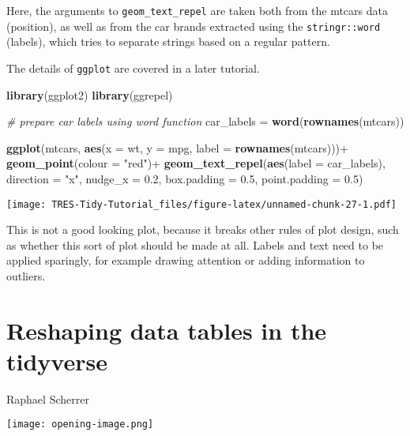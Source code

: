 \documentclass[
]{book}
\newenvironment{Shaded}{}{}
\newcommand{\CommentTok}[1]{\textcolor[rgb]{0.38,0.63,0.69}{\textit{#1}}}
\newcommand{\DataTypeTok}[1]{\textcolor[rgb]{0.56,0.13,0.00}{#1}}
\newcommand{\FloatTok}[1]{\textcolor[rgb]{0.25,0.63,0.44}{#1}}
\newcommand{\KeywordTok}[1]{\textcolor[rgb]{0.00,0.44,0.13}{\textbf{#1}}}
\newcommand{\NormalTok}[1]{#1}
\newcommand{\OperatorTok}[1]{\textcolor[rgb]{0.40,0.40,0.40}{#1}}
\newcommand{\StringTok}[1]{\textcolor[rgb]{0.25,0.44,0.63}{#1}}
\begin{document}
Here, the arguments to \texttt{geom\_text\_repel} are taken both from the mtcars data (position), as well as from the car brands extracted using the \texttt{stringr::word} (labels), which tries to separate strings based on a regular pattern.

The details of \texttt{ggplot} are covered in a later tutorial.

\begin{Shaded}
\begin{Highlighting}[]
\KeywordTok{library}\NormalTok{(ggplot2)}
\KeywordTok{library}\NormalTok{(ggrepel)}

\CommentTok{# prepare car labels using word function}
\NormalTok{car_labels =}\StringTok{ }\KeywordTok{word}\NormalTok{(}\KeywordTok{rownames}\NormalTok{(mtcars))}

\KeywordTok{ggplot}\NormalTok{(mtcars,}
       \KeywordTok{aes}\NormalTok{(}\DataTypeTok{x =}\NormalTok{ wt, }\DataTypeTok{y =}\NormalTok{ mpg,}
           \DataTypeTok{label =} \KeywordTok{rownames}\NormalTok{(mtcars)))}\OperatorTok{+}
\StringTok{  }\KeywordTok{geom_point}\NormalTok{(}\DataTypeTok{colour =} \StringTok{"red"}\NormalTok{)}\OperatorTok{+}
\StringTok{  }\KeywordTok{geom_text_repel}\NormalTok{(}\KeywordTok{aes}\NormalTok{(}\DataTypeTok{label =}\NormalTok{ car_labels),}
                  \DataTypeTok{direction =} \StringTok{"x"}\NormalTok{,}
                  \DataTypeTok{nudge_x =} \FloatTok{0.2}\NormalTok{,}
                  \DataTypeTok{box.padding =} \FloatTok{0.5}\NormalTok{,}
                  \DataTypeTok{point.padding =} \FloatTok{0.5}\NormalTok{)}
\end{Highlighting}
\end{Shaded}

\texttt{[image: TRES-Tidy-Tutorial\_files/figure-latex/unnamed-chunk-27-1.pdf]}

This is not a good looking plot, because it breaks other rules of plot design, such as whether this sort of plot should be made at all. Labels and text need to be applied sparingly, for example drawing attention or adding information to outliers.

\hypertarget{reshaping-data-tables-in-the-tidyverse}{%
\chapter{Reshaping data tables in the tidyverse}\label{reshaping-data-tables-in-the-tidyverse}}

Raphael Scherrer

\texttt{[image: opening-image.png]}
\end{document}
